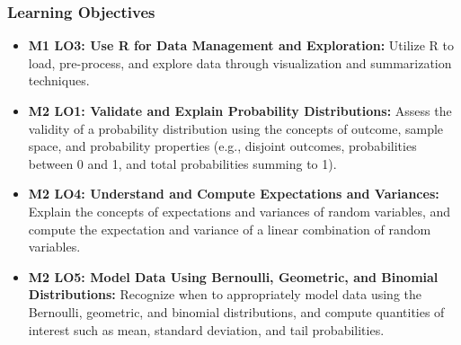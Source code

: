 \begin{frame}
    \frametitle{Learning Objectives}
    \begin{itemize}
        \item \textbf{M1 LO3: Use R for Data Management and Exploration:} Utilize R to load, pre-process, and explore data through visualization and summarization techniques.
        \item \textbf{M2 LO1: Validate and Explain Probability Distributions:} Assess the validity of a probability distribution using the concepts of outcome, sample space, and probability properties (e.g., disjoint outcomes, probabilities between 0 and 1, and total probabilities summing to 1).
        \item \textbf{M2 LO4: Understand and Compute Expectations and Variances:} Explain the concepts of expectations and variances of random variables, and compute the expectation and variance of a linear combination of random variables.
        \item \textbf{M2 LO5: Model Data Using Bernoulli, Geometric, and Binomial Distributions:} Recognize when to appropriately model data using the Bernoulli, geometric, and binomial distributions, and compute quantities of interest such as mean, standard deviation, and tail probabilities.
    \end{itemize}
\end{frame}


